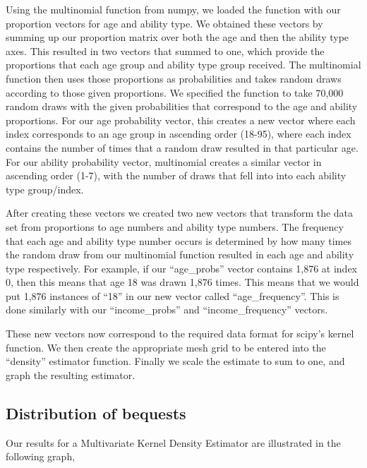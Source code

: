 \documentclass[letterpaper,12pt]{article}
\newcommand{\quotes}[1]{``#1''}
\theoremstyle{definition}
\begin{document}
\begin{spacing}{1.5}
    Using the multinomial function from numpy, we loaded the function with our proportion vectors for age and ability type. We obtained these vectors by summing up our proportion matrix over both the age and then the ability type axes. This resulted in two vectors that summed to one, which provide the proportions that each age group and ability type group received. The multinomial function then uses those proportions as probabilities and takes random draws according to those given proportions. We specified the function to take 70,000 random draws with the given probabilities that correspond to the age and ability proportions. For our age probability vector, this creates a new vector where each index corresponds to an age group in ascending order (18-95), where each index contains the number of times that a random draw resulted in that particular age. For our ability probability vector, multinomial creates a similar vector in ascending order (1-7), with the number of draws that fell into into each ability type group/index.

    After creating these vectors we created two new vectors that transform the data set from proportions to age numbers and ability type numbers. The frequency that each age and ability type number occurs is determined by how many times the random draw from our multinomial function resulted in each age and ability type respectively. For example, if our \quotes{age\_probs} vector contains 1,876 at index 0, then this means that age 18 was drawn 1,876 times. This means that we would put 1,876 instances of \quotes{18} in our new vector called \quotes{age\_frequency}. This is done similarly with our \quotes{income\_probs} and \quotes{income\_frequency} vectors.

    These new vectors now correspond to the required data format for scipy's kernel function. We then create the appropriate mesh grid to be entered into the \quotes{density} estimator function. Finally we scale the estimate to sum to one, and graph the resulting estimator.


  \subsection{Distribution of bequests}\label{SecDistEst}

    Our results for a Multivariate Kernel Density Estimator are illustrated in the following graph,\\


\end{spacing}
\end{document}
